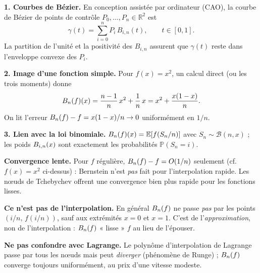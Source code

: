 
\begin{mdframed}[style=exbar]
  \textbf{1. Courbes de Bézier.}\enspace{}
  En conception assistée par ordinateur (CAO), la courbe de Bézier de points
  de contrôle $P_0,\dots,P_n\in\mathbb{R}^2$ est
  \[
    \gamma(t) = \sum_{i=0}^{n} P_i\,B_{i,n}(t),\qquad t\in[0,1].
  \]
  La partition de l'unité et la positivité des $B_{i,n}$ assurent que
  $\gamma(t)$ reste dans l'enveloppe convexe des $P_i$.

  \smallskip\noindent
  \textbf{2. Image d'une fonction simple.}
  Pour $f(x)=x^2$, un calcul direct (ou les trois moments) donne
  \[
    B_n(f)(x) = \frac{n-1}{n}\,x^2 + \frac{1}{n}\,x
             = x^2 + \frac{x(1-x)}{n}.
  \]
  On lit l'erreur $B_n(f)-f = x(1-x)/n \to 0$ uniformément en $1/n$.

  \smallskip\noindent
  \textbf{3. Lien avec la loi binomiale.}\enspace%
  $B_n(f)(x)=\mathbb{E}\!\left[f(S_n/n)\right]$ avec $S_n\sim\mathcal{B}(n,x)$ ;
  les poids $B_{i,n}(x)$ sont exactement les probabilités $\mathbb{P}(S_n=i)$.
\end{mdframed}

\vspace{6pt}

\begin{mdframed}[style=cexbar]
  \textbf{Convergence lente.}\enspace
  Pour $f$ régulière, $B_n(f)-f = O(1/n)$ seulement (cf. $f(x)=x^2$ ci-dessus) :
  Bernstein n'est \emph{pas} fait pour l'interpolation rapide. Les nœuds de
  Tchebychev offrent une convergence bien plus rapide pour les fonctions
  lisses.

  \smallskip\noindent
  \textbf{Ce n'est pas de l'interpolation.}\enspace
  En général $B_n(f)$ ne passe \emph{pas} par les points $(i/n,\,f(i/n))$,
  sauf aux extrémités $x=0$ et $x=1$. C'est de l'\emph{approximation},
  non de l'interpolation : $B_n(f)$ « lisse » $f$ au lieu de l'épouser.

  \smallskip\noindent
  \textbf{Ne pas confondre avec Lagrange.}\enspace
  Le polynôme d'interpolation de Lagrange passe par tous les nœuds mais peut
  \emph{diverger} (phénomène de Runge) ; $B_n(f)$ converge toujours
  uniformément, au prix d'une vitesse modeste.
\end{mdframed}

\vspace{6pt}
\exolabel

